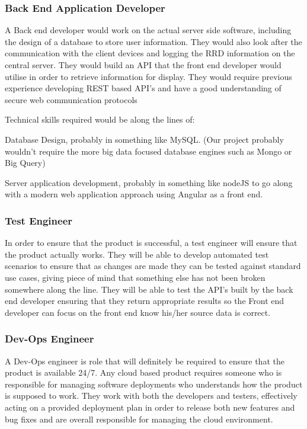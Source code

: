 \documentclass[11pt, oneside, a4paper, titlepage]{article}
\begin{document}
\subsubsection{Back End Application Developer}
A Back end developer would work on the actual server side software, including the design of a database to store user information.  They would also look after the communication with the client devices and logging the RRD information on the central server.  They would build an API that the front end developer would utilise in order to retrieve information for display.  They would require previous experience developing REST based API's and have a good understanding of secure web communication protocols 

Technical skills required would be along the lines of: 

Database Design, probably in something like MySQL. (Our project probably wouldn't require the more big data focused database engines such as Mongo or Big Query) 

Server application development, probably in something like nodeJS to go along with a modern web application approach using Angular as a front end. 

\subsubsection{Test Engineer}
In order to ensure that the product is successful, a test engineer will ensure that the product actually works.  They will be able to develop automated test scenarios to ensure that as changes are made they can be tested against standard use cases, giving piece of mind that something else has not been broken somewhere along the line.  They will be able to test the API's built by the back end developer ensuring that they return appropriate results so the Front  end developer can focus on the front end know his/her source data is correct. 

\subsubsection{Dev-Ops Engineer}
A Dev-Ops engineer is role that will definitely be required to ensure that the product is available 24/7.  Any cloud based product requires someone who is responsible for managing software deployments who understands how the product is supposed to work.  They work with both the developers and testers, effectively acting on a provided deployment plan in order to release both new features and bug fixes and are overall responsible for managing the cloud environment. 
\end{document}
